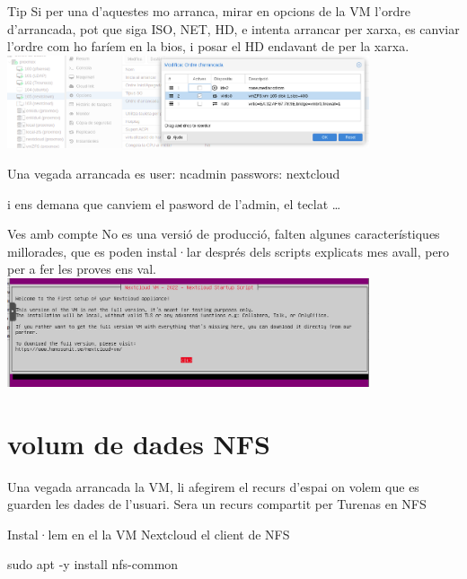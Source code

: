 \documentclass[
  10pt,
]{krantz}
\newenvironment{Shaded}{\begin{snugshade}}{\end{snugshade}}
\newcommand{\AttributeTok}[1]{\textcolor[rgb]{0.77,0.63,0.00}{#1}}
\newcommand{\FunctionTok}[1]{\textcolor[rgb]{0.00,0.00,0.00}{#1}}
\newcommand{\NormalTok}[1]{#1}
\begin{document}
\begin{rmdtip}{Tip}
Si per una d'aquestes mo arranca, mirar en opcions de la VM l'ordre d'arrancada, pot que siga ISO, NET, HD, e intenta arrancar per xarxa, es canviar l'ordre com ho faríem en la bios, i posar el HD endavant de per la xarxa. \includegraphics[width=0.8\textwidth,height=\textheight]{imatges/proxmox/orde_arrancada.png}

\end{rmdtip}

\begin{rmdinfo}{}
Una vegada arrancada es user: ncadmin passwors: nextcloud

\end{rmdinfo}

i ens demana que canviem el pasword de l'admin, el teclat \ldots{}

\begin{rmdcuidao}{Ves amb compte}
No es una versió de producció, falten algunes característiques millorades, que es poden instal·lar després dels scripts explicats mes avall, pero per a fer les proves ens val. \includegraphics[width=0.8\textwidth,height=\textheight]{imatges/proxmox/next_advert.png}

\end{rmdcuidao}

\hypertarget{volum-de-dades-nfs}{%
\section{volum de dades NFS}\label{volum-de-dades-nfs}}

Una vegada arrancada la VM, li afegirem el recurs d'espai on volem que es guarden les dades de l'usuari. Sera un recurs compartit per Turenas en NFS

Instal·lem en el la VM Nextcloud el client de NFS

\begin{Shaded}
\begin{Highlighting}[]
\FunctionTok{sudo}\NormalTok{ apt }\AttributeTok{{-}y}\NormalTok{ install nfs{-}common}
\end{Highlighting}
\end{Shaded}
\end{document}
